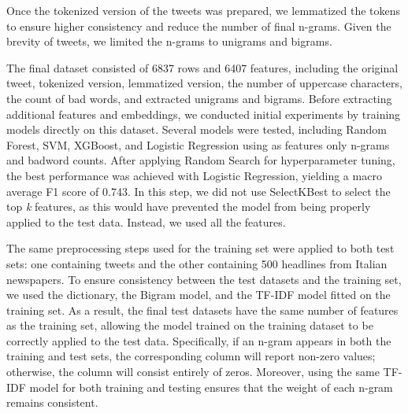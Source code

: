 Once the tokenized version of the tweets was prepared, we lemmatized the tokens to ensure higher consistency and reduce the number of final n-grams.
Given the brevity of tweets, we limited the n-grams to unigrams and bigrams.

The final dataset consisted of 6837 rows and 6407 features, including the original tweet, tokenized version, lemmatized version, the number of uppercase characters, the count of bad words, and extracted unigrams and bigrams. Before extracting additional features and embeddings, we conducted initial experiments by training models directly on this dataset.
Several models were tested, including Random Forest, SVM, XGBoost, and Logistic Regression using as features only n-grams and badword counts. After applying Random Search for hyperparameter tuning, the best performance was achieved with Logistic Regression, yielding a macro average F1 score of 0.743.
In this step, we did not use SelectKBest to select the top \textit{k} features, as this would have prevented the model from being properly applied to the test data. Instead, we used all the features.

The same preprocessing steps used for the training set were applied to both test sets: one containing tweets and the other containing 500 headlines from Italian newspapers. To ensure consistency between the test datasets and the training set, we used the dictionary, the Bigram model, and the TF-IDF model fitted on the training set.
As a result, the final test datasets have the same number of features as the training set, allowing the model trained on the training dataset to be correctly applied to the test data. Specifically, if an n-gram appears in both the training and test sets, the corresponding column will report non-zero values; otherwise, the column will consist entirely of zeros. Moreover, using the same TF-IDF model for both training and testing ensures that the weight of each n-gram remains consistent.
